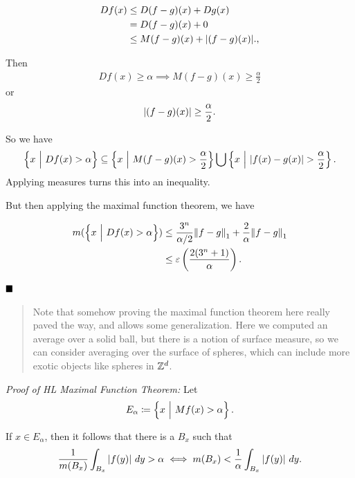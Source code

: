 \begin{align*}
Df(x) 
&\leq D(f-g)(x) + Dg(x) \\
&=D(f-g)(x) + 0 \\
&\leq M(f-g)(x) + {\left\lvert {(f-g)(x)} \right\rvert}.
,\end{align*}

Then
\begin{align*}
Df(x) \geq \alpha \implies M(f-g)(x) \geq \frac{\alpha}{2}
\end{align*} or
\begin{align*}
{\left\lvert {(f-g)(x)} \right\rvert} \geq \frac{\alpha}{2}
.\end{align*}

So we have
\begin{align*}
\left\{{x{~\mathrel{\Big|}~} Df(x) > \alpha}\right\} \subseteq \left\{{x{~\mathrel{\Big|}~} M(f-g)(x) > \frac\alpha 2}\right\} \bigcup \left\{{x{~\mathrel{\Big|}~} {\left\lvert {f(x) - g(x)} \right\rvert} > \frac\alpha 2}\right\}
.\end{align*} Applying measures turns this into an inequality.

But then applying the maximal function theorem, we have

\begin{align*}
m(\left\{{x{~\mathrel{\Big|}~} Df(x) > \alpha}\right\}) 
&\leq \frac{3^n}{\alpha/2} {\left\lVert {f-g} \right\rVert}_1 + \frac 2 \alpha {\left\lVert {f-g} \right\rVert}_1 \\
&\leq \varepsilon \left(\frac{2(3^n + 1)}{\alpha} \right)
.\end{align*}

\(\qed\)

\begin{quote}
Note that somehow proving the maximal function theorem here really paved
the way, and allows some generalization. Here we computed an average
over a solid ball, but there is a notion of surface measure, so we can
consider averaging over the surface of spheres, which can include more
exotic objects like spheres in \({\mathbb{Z}}^d\).
\end{quote}

\emph{Proof of HL Maximal Function Theorem:} Let
\begin{align*}
E_\alpha \coloneqq \left\{{x{~\mathrel{\Big|}~} Mf(x) > \alpha}\right\}
.\end{align*}

If \(x\in E_\alpha\), then it follows that there is a \(B_x\) such that
\begin{align*}
\frac{1}{m(B_x)} \int_{B_x} {\left\lvert {f(y)} \right\rvert} ~dy > \alpha \iff m(B_x) < \frac 1 \alpha \int_{B_x} {\left\lvert {f(y)} \right\rvert} ~dy
.\end{align*}


